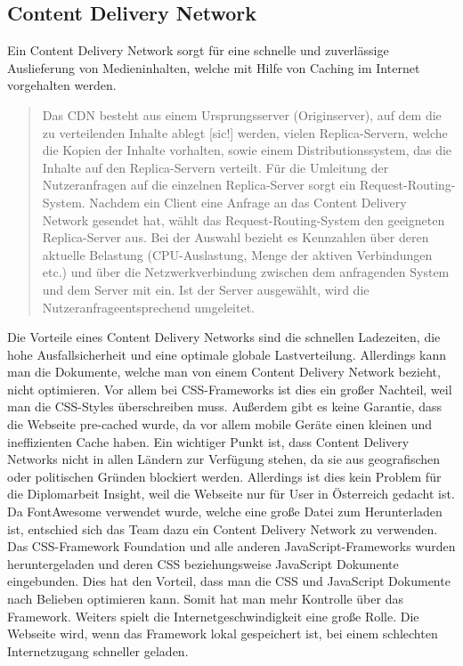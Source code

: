 \subsection{Content Delivery Network}
Ein Content Delivery Network sorgt für eine schnelle und zuverlässige Auslieferung von Medieninhalten, welche mit Hilfe von Caching im Internet vorgehalten werden. 

\begin{quote}
Das CDN besteht aus einem Ursprungsserver (Originserver), auf dem die zu verteilenden Inhalte ablegt [sic!] werden, vielen Replica-Servern, welche die Kopien der Inhalte vorhalten, sowie einem Distributionssystem, das die Inhalte auf den Replica-Servern verteilt. Für die Umleitung der Nutzeranfragen auf die einzelnen Replica-Server sorgt ein Request-Routing-System. Nachdem ein Client eine Anfrage an das Content Delivery Network gesendet hat, wählt das Request-Routing-System den geeigneten Replica-Server aus. Bei der Auswahl bezieht es Kennzahlen über deren aktuelle Belastung (CPU-Auslastung, Menge der aktiven Verbindungen etc.) und über die Netzwerkverbindung zwischen dem anfragenden System und dem Server mit ein. Ist der Server ausgewählt, wird die Nutzeranfrageentsprechend umgeleitet.
\end{quote}
Die Vorteile eines Content Delivery Networks sind die schnellen Ladezeiten, die hohe Ausfallsicherheit und eine optimale globale Lastverteilung. Allerdings kann man die Dokumente, welche man von einem Content Delivery Network bezieht, nicht optimieren. Vor allem bei CSS-Frameworks ist dies ein großer Nachteil, weil man die CSS-Styles überschreiben muss. Außerdem gibt es keine Garantie, dass die Webseite pre-cached wurde, da vor allem mobile Geräte einen kleinen und ineffizienten Cache haben. Ein wichtiger Punkt ist, dass Content Delivery Networks nicht in allen Ländern zur Verfügung stehen, da sie aus geografischen oder politischen Gründen blockiert werden. Allerdings ist dies kein Problem für die Diplomarbeit Insight, weil die Webseite nur für User in Österreich gedacht ist.  
\leavevmode \\
Da FontAwesome verwendet wurde, welche eine große Datei zum Herunterladen ist, entschied sich das Team dazu ein Content Delivery Network zu verwenden. Das CSS-Framework Foundation und alle anderen JavaScript-Frameworks wurden heruntergeladen und deren CSS beziehungsweise JavaScript Dokumente eingebunden. Dies hat den Vorteil, dass man die CSS und JavaScript Dokumente nach Belieben optimieren kann. Somit hat man mehr Kontrolle über das Framework. Weiters spielt die Internetgeschwindigkeit eine große Rolle. Die Webseite wird, wenn das Framework lokal gespeichert ist, bei einem schlechten Internetzugang schneller geladen.
